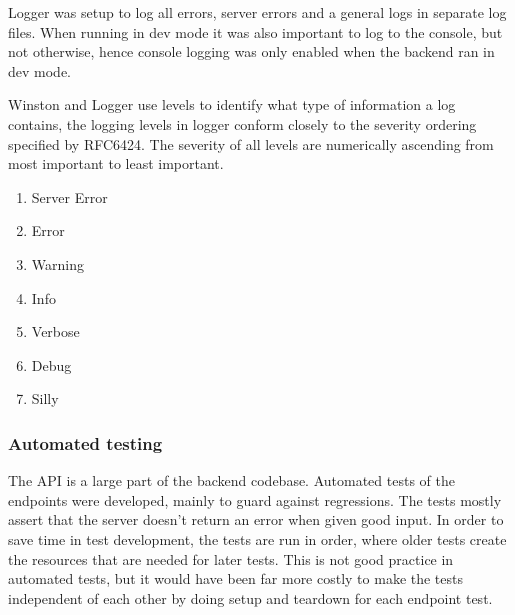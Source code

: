 Logger was setup to log all errors, server errors and a general logs in separate log files. When running in dev mode it was also important to log to the console, but not otherwise, hence console logging was only enabled when the backend ran in dev mode. 

Winston and Logger use levels to identify what type of information a log contains, the logging levels in logger conform closely to the severity ordering specified by RFC6424.
The severity of all levels are numerically ascending from most important to least important.

\begin{enumerate}
  \item Server Error
  \item Error
  \item Warning
  \item Info
  \item Verbose
  \item Debug
  \item Silly
\end{enumerate}

\subsubsection{Automated testing}
The API is a large part of the backend codebase. Automated tests of the endpoints were developed, mainly to guard against regressions. The tests mostly assert that the server doesn't return an error when given good input. In order to save time in test development, the tests are run in order, where older tests create the resources that are needed for later tests. This is not good practice in automated tests, but it would have been far more costly to make the tests independent of each other by doing setup and teardown for each endpoint test.
